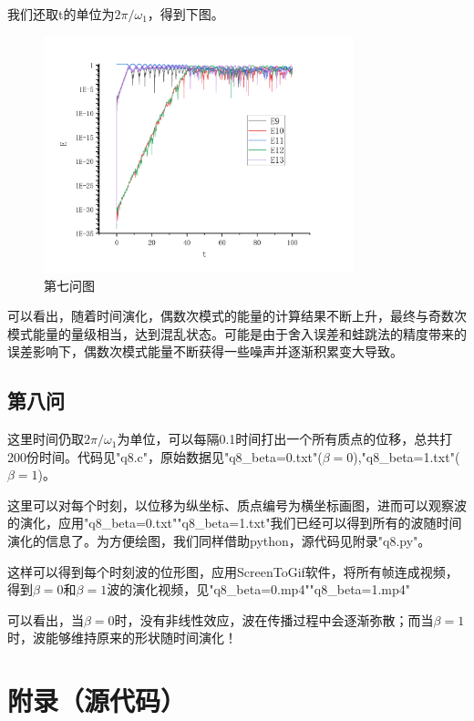 \documentclass[10pt, a4paper]{article}
\begin{document}
    我们还取t的单位为$2\pi/\omega_1$，得到下图。

    \begin{figure}[H]
        \centering
        \includegraphics[width=0.8\textwidth]{第七问图.jpg}
        \caption{第七问图}\label{fig:第七问图}
    \end{figure}

    可以看出，随着时间演化，偶数次模式的能量的计算结果不断上升，最终与奇数次模式能量的量级相当，达到混乱状态。可能是由于舍入误差和蛙跳法的精度带来的误差影响下，偶数次模式能量不断获得一些噪声并逐渐积累变大导致。

    \subsection{第八问}

    这里时间仍取$2\pi/\omega_1$为单位，可以每隔0.1时间打出一个所有质点的位移，总共打200份时间。代码见"q8.c"，原始数据见"q8_beta=0.txt"($\beta=0$),"q8_beta=1.txt"($\beta=1$)。

    这里可以对每个时刻，以位移为纵坐标、质点编号为横坐标画图，进而可以观察波的演化，应用"q8_beta=0.txt""q8_beta=1.txt"我们已经可以得到所有的波随时间演化的信息了。为方便绘图，我们同样借助python，源代码见附录"q8.py"。

    这样可以得到每个时刻波的位形图，应用ScreenToGif软件，将所有帧连成视频，得到$\beta=0$和$\beta=1$波的演化视频，见"q8_beta=0.mp4""q8_beta=1.mp4"

    可以看出，当$\beta=0$时，没有非线性效应，波在传播过程中会逐渐弥散；而当$\beta=1$时，波能够维持原来的形状随时间演化！

    \section{附录（源代码）}
\end{document}
